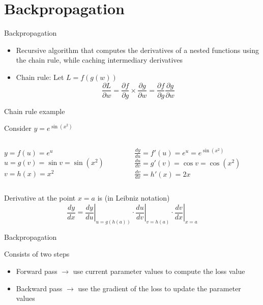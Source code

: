 \documentclass[12pt]{beamer}
\begin{document}
\section{Backpropagation}

\begin{frame}{Backpropagation}
	\begin{itemize}
		\item Recursive algorithm that computes the derivatives of a nested functions using the chain rule, while caching intermediary derivatives 
		\item Chain rule: Let $L = f(g(w))$
		\begin{equation*}
		\frac{\partial L}{\partial w} = \frac{\partial f}{\partial g}\times \frac{\partial g}{\partial w}   = \frac{\partial f}{\partial g}\frac{\partial g}{\partial w}
		\end{equation*}
	\end{itemize}
\end{frame}

\begin{frame}{Chain rule example}

Consider $y=e^{\sin(x^{2})}$

\bigskip

\begin{columns}
	\begin{column}{0.5\linewidth}
$y = f(u) = e^u$ \\
$u = g(v) = \sin v = \sin (x^2)$ \\
$v = h(x) = x^2$
	\end{column}
	\begin{column}{0.5\linewidth}
$\frac{dy}{du} = f'(u) = e^u = e^{\sin(x^{2})}$ \\
$\frac{du}{dv} = g'(v) = \cos v = \cos (x^2)$ \\
$\frac{dv}{dx} = h'(x) = 2x$
	\end{column}
\end{columns}

\bigskip


Derivative at the point $x = a$ is (in Leibniz notation)
$$
{\frac {dy}{dx}}=\left.{\frac {dy}{du}}\right|_{u=g(h(a))}\cdot \left.{\frac {du}{dv}}\right|_{v=h(a)}\cdot \left.{\frac {dv}{dx}}\right|_{x=a}
$$
	
\end{frame}

\begin{frame}{Backpropagation}

Consists of two steps

\begin{itemize}
	\item Forward pass $\rightarrow$ use current parameter values to compute the loss value
	\item Backward pass $\rightarrow$ use the gradient of the loss to update the parameter values
\end{itemize}

\end{frame}
\end{document}
